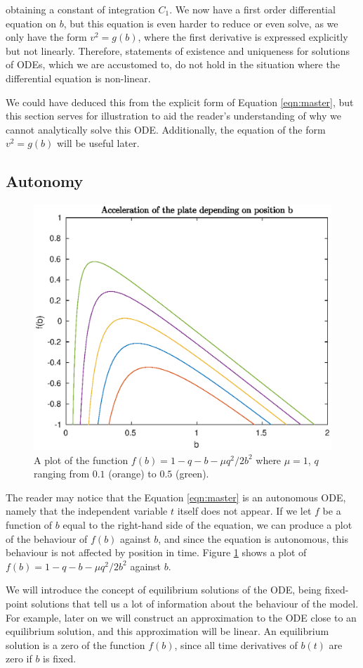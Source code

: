 \documentclass{article}
\begin{document}
obtaining a constant of integration $C_1$.
We now have a first order differential equation on $b$, %
but this equation is even harder to reduce or even solve, as we only have the form $v^2 = g(b)$,
where the first derivative is expressed explicitly but not linearly.
Therefore, statements of existence and uniqueness for solutions of ODEs,
which we are accustomed to,
do not hold in the situation where the differential equation is non-linear.

We could have deduced this from the explicit form of Equation \ref{eqn:master},
but this section serves for illustration to aid the reader's understanding of why we cannot analytically solve this ODE.
Additionally, the equation of the form $v^2 = g(b)$ will be useful later.

\subsection{Autonomy}

\begin{figure}
    \centering
    \includegraphics[width=0.5\linewidth]{f_plot_mu_1_q_vary}
    \caption{A plot of the function $f(b) = 1-q-b-\mu q^2/2b^2$ where $\mu=1$, $q$ ranging from $0.1$ (orange) to $0.5$ (green).}
    \label{fig:acc_b_plot}
\end{figure}

The reader may notice that the Equation \ref{eqn:master} is an autonomous ODE,
namely that the independent variable $t$ itself does not appear.
If we let $f$ be a function of $b$ equal to the right-hand side of the equation,
we can produce a plot of the behaviour of $f(b)$ against $b$,
and since the equation is autonomous, this behaviour is not affected by position in time.
Figure \ref{fig:acc_b_plot} shows a plot of $f(b)= 1 - q - b - \mu q^2/2b^2$ against $b$.

We will introduce the concept of equilibrium solutions of the ODE,
being fixed-point solutions that tell us a lot of information about the behaviour of the model.
For example, later on we will construct an approximation to the ODE close to an equilibrium solution,
and this approximation will be linear.
An equilibrium solution is a zero of the function \(f(b)\), since all time derivatives of \(b(t)\) are zero if \(b\) is fixed.
\end{document}
